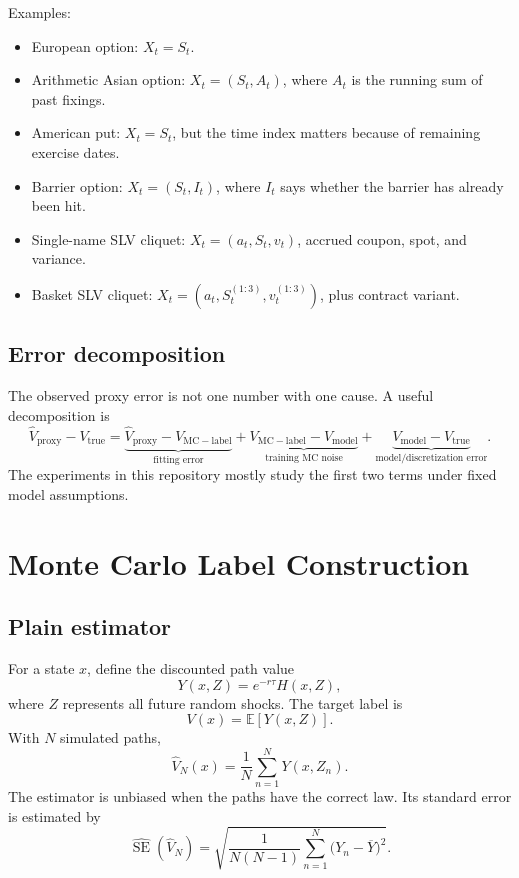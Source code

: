 \documentclass[11pt,oneside]{book}
\theoremstyle{definition}
\newcommand{\E}{\mathbb{E}}
\newcommand{\se}{\operatorname{SE}}
\begin{document}
Examples:
\begin{itemize}
  \item European option: \(X_t=S_t\).
  \item Arithmetic Asian option: \(X_t=(S_t,A_t)\), where \(A_t\) is the running sum of past fixings.
  \item American put: \(X_t=S_t\), but the time index matters because of remaining exercise dates.
  \item Barrier option: \(X_t=(S_t,I_t)\), where \(I_t\) says whether the barrier has already been hit.
  \item Single-name SLV cliquet: \(X_t=(a_t,S_t,v_t)\), accrued coupon, spot, and variance.
  \item Basket SLV cliquet: \(X_t=(a_t,S_t^{(1:3)},v_t^{(1:3)})\), plus contract variant.
\end{itemize}

\section{Error decomposition}
The observed proxy error is not one number with one cause. A useful decomposition is
\[
  \widehat V_{\mathrm{proxy}} - V_{\mathrm{true}}
  =
  \underbrace{\widehat V_{\mathrm{proxy}} - V_{\mathrm{MC-label}}}_{\text{fitting error}}
  +
  \underbrace{V_{\mathrm{MC-label}}-V_{\mathrm{model}}}_{\text{training MC noise}}
  +
  \underbrace{V_{\mathrm{model}}-V_{\mathrm{true}}}_{\text{model/discretization error}}.
\]
The experiments in this repository mostly study the first two terms under fixed model assumptions.

\chapter{Monte Carlo Label Construction}

\section{Plain estimator}
For a state \(x\), define the discounted path value
\[
  Y(x,Z)=e^{-r\tau}H(x,Z),
\]
where \(Z\) represents all future random shocks. The target label is
\[
  V(x)=\E[Y(x,Z)].
\]
With \(N\) simulated paths,
\[
  \widehat V_N(x)=\frac1N\sum_{n=1}^N Y(x,Z_n).
\]
The estimator is unbiased when the paths have the correct law. Its standard error is estimated by
\[
  \widehat{\se}(\widehat V_N)
  =
  \sqrt{\frac{1}{N(N-1)}\sum_{n=1}^N\bigl(Y_n-\overline Y\bigr)^2}.
\]
\end{document}
